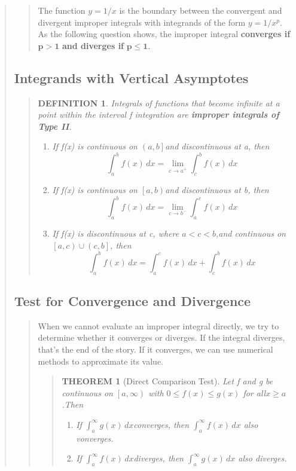\documentclass{report}
\newtheorem{theorem}{THEOREM}
\newtheorem*{definition}{DEFINITION}
\begin{document}
\begin{quote}
\begin{quote}
		The function $y = 1/x$ is the boundary between the convergent and divergent improper integrals with integrands of the form $y = 1/x^p$. As the following question shows, the improper integral \textbf{converges if} $\mathbf{p > 1}$ \textbf{and diverges if} $\mathbf{p \leqslant 1}$.

		
	\end{quote}

	\subsection{Integrands with Vertical Asymptotes}
	\begin{quote}
		
		\begin{definition}
			Integrals of functions that become infinite at a point within the interval f integration are \textbf{improper integrals of Type II}.
			\begin{enumerate}
				\item If f(x) is continuous on $\left (a,b\right ]$and discontinuous at a, then $$\int_{a}^{b}f(x)\,dx = \lim_{c\to a^+} \int_{c}^{b}f(x)\,dx$$
				\item If f(x) is continuous on $\left [a,b\right )$and discontinuous at b, then $$\int_{a}^{b}f(x)\,dx = \lim_{c \to b^-} \int_{a}^{c}f(x)\,dx$$
				\item If f(x) is discontinuous at c, where $a<c<b$,and continuous on $\left [a,c\right ) \cup \left(c,b\right ]$, then $$\int_{a}^{b}f(x)\,dx = \int_{a}^{c}f(x)\,dx + \int_{c}^{b}f(x)\,dx$$
			\end{enumerate}
		\end{definition}

	\end{quote}

	\subsection{Test for Convergence and Divergence}
	\begin{quote}
		When we cannot evaluate an improper integral directly, we try to determine whether it converges or diverges. If the integral diverges, that’s the end of the story. If it converges, we can use numerical methods to approximate its value. 
		\begin{quote}
			\begin{theorem}[Direct Comparison Test]
				Let f and g be continuous on $\left [ a,\infty \right )$ with $0\leq f(x)\leq g(x)$ for all$x\geq a$.Then
				\begin{enumerate}
					\item If $\int_{a}^{\infty} g(x)\, dx$converges, then $\int_{a}^{\infty}f(x)\,dx$ also vonverges.
					\item If $\int_{a}^{\infty} f(x)\, dx$diverges, then $\int_{a}^{\infty}g(x)\,dx$ also diverges.
				\end{enumerate}
			\end{theorem}


\end{quote}
\end{quote}
\end{quote}
\end{document}
